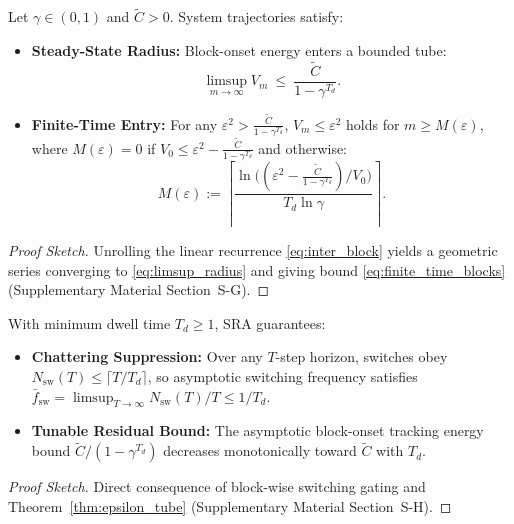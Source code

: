 \documentclass{ccjnl}
\newcommand{\rev}[1]{#1}
\def\rev#1{#1}%
\begin{document}
\begin{theorem}
\label{thm:epsilon_tube}
Let $\gamma \in (0,1)$ and $\tilde C > 0$. System trajectories satisfy:
\begin{itemize}
    \item[\textit{(a)}] \textbf{Steady-State Radius:} Block-onset energy enters a bounded tube:
    \begin{equation}\label{eq:limsup_radius}
    \limsup_{m\to\infty}V_m\ \le\ \frac{\tilde C}{1-\gamma^{T_d}}.
    \end{equation}
    \item[\textit{(b)}] \textbf{Finite-Time Entry:} For any $\varepsilon^2 > \frac{\tilde C}{1-\gamma^{T_d}}$, $V_m \le \varepsilon^2$ holds for $m \ge M(\varepsilon)$, where $M(\varepsilon)=0$ if $V_0 \le \varepsilon^2 - \frac{\tilde C}{1-\gamma^{T_d}}$ and otherwise:
    \begin{equation}\label{eq:finite_time_blocks}
    \rev{M(\varepsilon) := \left\lceil \frac{\ln\!\big((\varepsilon^2 - \frac{\tilde C}{1-\gamma^{T_d}})/V_0\big)}{T_d \ln \gamma} \right\rceil.}
    \end{equation}
\end{itemize}
\end{theorem}
\begin{proof}[Proof Sketch]
Unrolling the linear recurrence \eqref{eq:inter_block} yields a geometric series converging to \eqref{eq:limsup_radius} and giving bound \eqref{eq:finite_time_blocks} (Supplementary Material Section~S-G).
\end{proof}

\begin{theorem}
\label{thm:practical_stability}
With minimum dwell time $T_d \ge 1$, SRA guarantees:
\begin{itemize}
    \item[\textit{(a)}] \textbf{Chattering Suppression:} \rev{Over any $T$-step horizon, switches obey $N_{\text{sw}}(T) \le \lceil T/T_d \rceil$, so asymptotic switching frequency satisfies $\bar{f}_{\text{sw}} = \limsup_{T\to\infty} N_{\text{sw}}(T)/T \le 1/T_d$.}
    \item[\textit{(b)}] \textbf{Tunable Residual Bound:} \rev{The asymptotic block-onset tracking energy bound $\tilde{C}/(1-\gamma^{T_d})$ decreases monotonically toward $\tilde{C}$ with $T_d$.}
\end{itemize}
\end{theorem}
\begin{proof}[Proof Sketch]
Direct consequence of block-wise switching gating and Theorem~\ref{thm:epsilon_tube} (Supplementary Material Section~S-H).
\end{proof}
\end{document}
